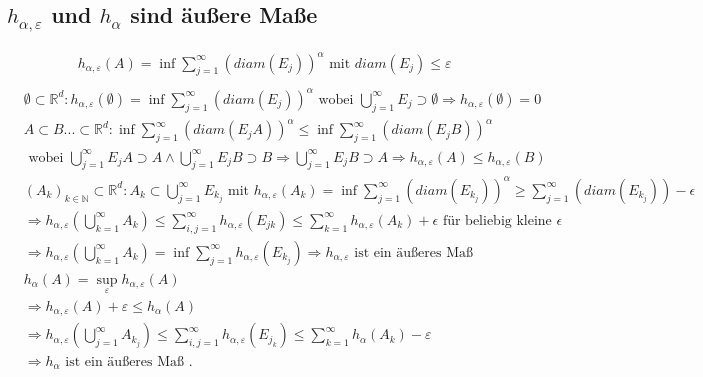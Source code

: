 \documentclass[12pt,a4paper]{article}
\begin{document}
\subsection{ $h_{\alpha, \varepsilon}$ und $h_{\alpha}$ sind äußere Maße }
\begin{align*}
	&h_{\alpha, \varepsilon}(A) = \inf\sum_{j=1}^{\infty}(diam(E_j))^{\alpha} \text{ mit } diam(E_j) \leq \varepsilon \\
\end{align*}
\begin{align*}
	&\emptyset \subset \mathbb{R}^d : h_{\alpha, \varepsilon}(\emptyset)  = \inf \sum_{j=1}^{\infty} (diam(E_j))^{\alpha} \text{ wobei } \bigcup_{j=1}^{\infty}E_j \supset \emptyset \Rightarrow h_{\alpha, \varepsilon}(\emptyset) = 0	\\
	&A \subset B ... \subset \mathbb{R}^d : \inf \sum_{j=1}^{\infty} (diam(E_jA))^{\alpha} \leq \inf \sum_{j=1}^{\infty} (diam(E_jB))^{\alpha}\\
	& \text{ wobei } \bigcup_{j=1}^{\infty}E_jA \supset A \land \bigcup_{j=1}^{\infty}E_jB \supset B \Rightarrow \bigcup_{j=1}^{\infty}E_jB \supset A \Rightarrow h_{\alpha, \varepsilon}(A) \leq h_{\alpha, \varepsilon}(B)\\
	&(A_k)_{k \in \mathbb{N}} \subset \mathbb{R}^d: A_k \subset \bigcup_{j=1}^\infty E_{k_j} \text{ mit } h_{\alpha, \varepsilon}(A_k) = \inf \sum_{j=1}^{\infty}(diam(E_{k_j}))^\alpha  \geq \sum_{j=1}^{\infty}(diam(E_{k_j})) - \epsilon  \\
	&\Rightarrow h_{\alpha, \varepsilon}(\bigcup_{k=1}^{\infty}A_k) \leq \sum_{i, j=1}^{\infty} h_{\alpha, \varepsilon}(E_{jk})\leq \sum_{k=1}^{\infty} h_{\alpha, \varepsilon}(A_k) + \epsilon 
	\text{ für beliebig kleine }\epsilon\\
	&\Rightarrow h_{\alpha, \varepsilon}(\bigcup_{k=1}^{\infty}A_k) = \inf \sum_{j=1}^{\infty} h_{\alpha, \varepsilon}(E_{k_j}) \Rightarrow h_{\alpha, \varepsilon} \text{  ist ein äußeres Maß }\\	
	&h_{\alpha}(A) = \sup_{\varepsilon} h_{\alpha, \varepsilon}(A)\\
	&\Rightarrow h_{\alpha, \varepsilon}(A) + \varepsilon \leq h_{\alpha}(A)\\
	&\Rightarrow h_{\alpha, \varepsilon}(\bigcup_{j=1}^\infty A_{k_j} ) \le \sum_{i, j=1}^{\infty} h_{\alpha, \varepsilon}(E_{j_k})\leq \sum_{k=1}^{\infty} h_{\alpha}(A_k) - \varepsilon\\
	&\Rightarrow h_{\alpha} \text{ ist ein äußeres Maß .} 
\end{align*}
\end{document}
